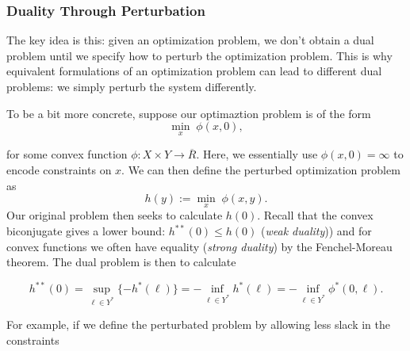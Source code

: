 \documentclass[11pt]{article}
\begin{document}
\subsubsection{Duality Through Perturbation}

The key idea is this: given an optimization problem, we don't obtain a dual problem 
until we specify how to perturb the optimization problem. This is why equivalent formulations 
of an optimization problem can lead to different dual problems: we simply perturb the system differently.

To be a bit more concrete, suppose our optimaztion problem is of the form
%
  \[\min_x \; \phi(x, 0),\]
%

\noindent for some convex function $\phi: X \times Y \to \overline{R}$. Here, we essentially use
$\phi(x, 0) = \infty$ to encode constraints on $x$. We can then define the perturbed optimization problem as
%
  \[h(y) := \min_x \; \phi(x, y).\]
%
\noindent Our original problem then seeks to calculate $h(0)$. Recall that the convex biconjugate
gives a lower bound: $h^{**}(0) \leq h(0)$ (\emph{weak duality})) and for convex functions we often have equality
(\emph{strong duality}) by the Fenchel-Moreau theorem. The dual problem is then to calculate 

\[h^{**}(0) = \sup_{\ell \in Y^*}\{-h^*(\ell)\} = - \inf_{\ell \in Y^*} h^*(\ell) = - \inf_{\ell \in Y^*} \phi^*(0, \ell).\]

For example, if we define the perturbated problem by allowing less slack in the constraints
\end{document}
